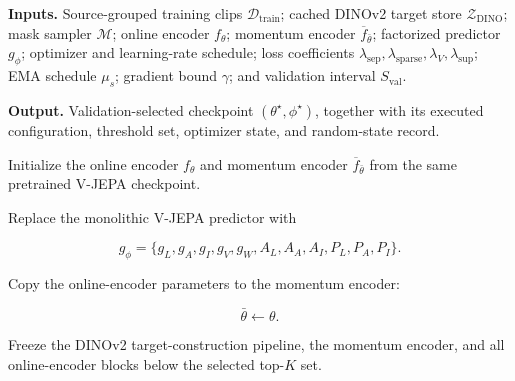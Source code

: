 \begin{tcolorbox}[
    enhanced jigsaw,
    breakable,
    colback=AlgBackground,
    colframe=AlgBorder,
    colbacktitle=AlgTitleBackground,
    coltitle=AlgAccent,
    fonttitle=\bfseries\small,
    title={
        Algorithm~\thefactoralgorithm:
        Executed FactorJEPA Training Procedure
    },
    title after break={
        Algorithm~\thefactoralgorithm\ (continued):
        Executed FactorJEPA Training Procedure
    },
    boxrule=0.55pt,
    arc=1.2mm,
    outer arc=1.2mm,
    left=5pt,
    right=5pt,
    top=5pt,
    bottom=5pt,
    before skip=8pt,
    after skip=8pt,
    pad at break*=2mm,
    fontupper=\footnotesize
]

\textbf{Inputs.}
Source-grouped training clips
\(\mathcal D_{\mathrm{train}}\);
cached DINOv2 target store
\(\mathcal Z_{\mathrm{DINO}}\);
mask sampler \(\mathcal M\);
online encoder \(f_\theta\);
momentum encoder \(\overline f_{\bar\theta}\);
factorized predictor \(g_\phi\);
optimizer and learning-rate schedule;
loss coefficients
\(\lambda_{\mathrm{sep}},
\lambda_{\mathrm{sparse}},
\lambda_V,
\lambda_{\mathrm{sup}}\);
EMA schedule \(\mu_s\);
gradient bound \(\gamma\);
and validation interval \(S_{\mathrm{val}}\).

\smallskip

\textbf{Output.}
Validation-selected checkpoint
\((\theta^\star,\phi^\star)\), together with its executed
configuration, threshold set, optimizer state, and random-state record.

\begin{algsteps}


\item
Initialize the online encoder \(f_\theta\) and momentum encoder
\(\overline f_{\bar\theta}\) from the same pretrained V-JEPA
checkpoint.

\item
Replace the monolithic V-JEPA predictor with

\[
g_\phi
=
\{
g_L,g_A,g_I,g_V,g_W,
A_L,A_A,A_I,
P_L,P_A,P_I
\}.
\]

\item
Copy the online-encoder parameters to the momentum encoder:

\[
\bar\theta\gets\theta.
\]

\item
Freeze the DINOv2 target-construction pipeline, the momentum encoder,
and all online-encoder blocks below the selected top-\(K\) set.


\end{algsteps}
\end{tcolorbox}
